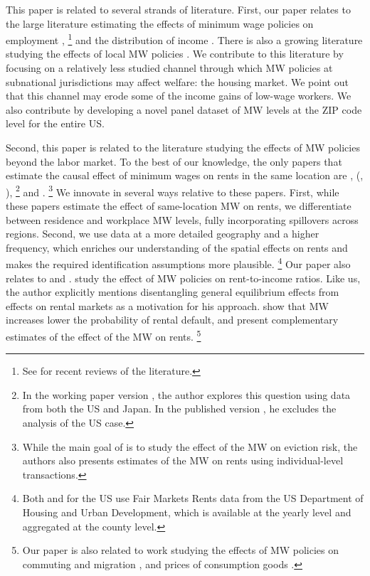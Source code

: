 
This paper is related to several strands of literature.
First, our paper relates to the large literature estimating the effects of 
minimum wage policies on employment
\parencite[e.g.,][]{CardKrueger1994, NeumarkWascher2007, MeerWest2016, CegnizEtAl2019},%
\footnote{See \textcite{Dube2019, NeumarkShirley2021} for recent reviews of the 
literature.} 
and the distribution of income 
\parencite[e.g.,][]{Lee1999, AutorEtAl2016, Dube2019Income}.
There is also a growing literature studying the effects of local MW 
policies \parencite[e.g.,][]{DubeNaiduReich2007, SchmittRosnick2011, DubeLindner2021}.
We contribute to this literature by focusing on a relatively less studied 
channel through which MW policies at subnational jurisdictions may affect 
welfare: the housing market.
We point out that this channel may erode some of the income gains of low-wage 
workers.
We also contribute by developing a novel panel dataset of MW levels at the 
ZIP code level for the entire US.

Second, this paper is related to the literature studying the effects of MW 
policies beyond the labor market.
To the best of our knowledge, the only papers that estimate the causal effect 
of minimum wages on rents in the same location are \textcite{Tidemann2018}, 
\citeauthor{Yamagishi2019} (\cite*{Yamagishi2019}, \cite*{Yamagishi2021}),%
\footnote{In the working paper version \parencite{Yamagishi2019}, the author 
explores this question using data from both the US and Japan.
In the published version \parencite{Yamagishi2021}, he excludes the analysis of 
the US case.}
and \textcite{AgarwalEtAl2021}.%
\footnote{While the main goal of \textcite{AgarwalEtAl2021} is to study the 
effect of the MW on eviction risk, the authors also presents estimates of the
MW on rents using individual-level transactions.}
We innovate in several ways relative to these papers.
First, while these papers estimate the effect of same-location MW on rents, we 
differentiate between residence and workplace MW levels, fully incorporating
spillovers across regions.
Second, we use data at a more detailed geography and a higher frequency, which
enriches our understanding of the spatial effects on rents and makes the 
required identification assumptions more plausible.%
\footnote{Both \textcite{Tidemann2018} and \textcite{Yamagishi2019} for the US 
use Fair Markets Rents data from the US Department of Housing and Urban 
Development, which is available at the yearly level and aggregated at the 
county level.}
Our paper also relates to \textcite{Hughes2020} and \textcite{AgarwalEtAl2021}.
\textcite{Hughes2020} study the effect of MW policies on rent-to-income ratios.
Like us, the author explicitly mentions disentangling general equilibrium 
effects from effects on rental markets as a motivation for his approach.
\textcite{AgarwalEtAl2021} show that MW increases lower the probability of 
rental default, and present complementary estimates of the effect of the MW 
on rents.%
\footnote{Our paper is also related to work studying the effects of MW policies 
on commuting and migration \parencite{Cadena2014, Monras2019, PerezPerez2021}, and 
prices of consumption goods \parencite{AllegrettoReich2018, Leung2021}.}

